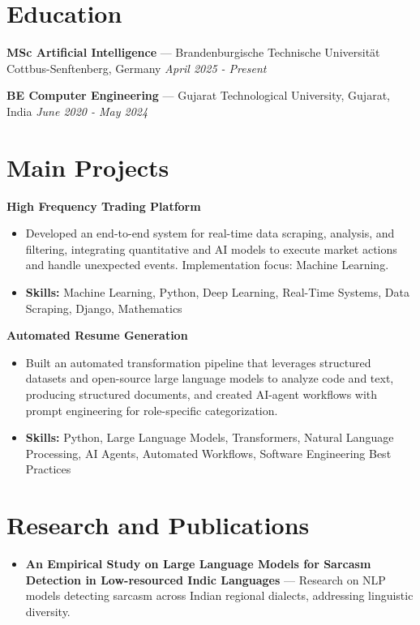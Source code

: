 \documentclass[a4paper,10pt]{article}
\begin{document}
\section*{Education}
\textbf{MSc Artificial Intelligence} — Brandenburgische Technische Universität Cottbus-Senftenberg, Germany \hfill \textit{April 2025 - Present}\par
\vspace{1.5pt}
\textbf{BE Computer Engineering} — Gujarat Technological University, Gujarat, India \hfill \textit{June 2020 - May 2024}\par

\section*{Main Projects}
\textbf{High Frequency Trading Platform}\par
\vspace{1pt}
\begin{itemize}
  \item Developed an end-to-end system for real-time data scraping, analysis, and filtering, integrating quantitative and AI models to execute market actions and handle unexpected events. Implementation focus: Machine Learning.
  \item \textbf{Skills:} Machine Learning, Python, Deep Learning, Real-Time Systems, Data Scraping, Django, Mathematics
\end{itemize}
\vspace{3pt}
\textbf{Automated Resume Generation}\par
\vspace{1pt}
\begin{itemize}
  \item Built an automated transformation pipeline that leverages structured datasets and open-source large language models to analyze code and text, producing structured documents, and created AI-agent workflows with prompt engineering for role-specific categorization.
  \item \textbf{Skills:} Python, Large Language Models, Transformers, Natural Language Processing, AI Agents, Automated Workflows, Software Engineering Best Practices
\end{itemize}

\section*{Research and Publications}
\begin{itemize}
\item \textbf{An Empirical Study on Large Language Models for Sarcasm Detection in Low-resourced Indic Languages} — Research on NLP models detecting sarcasm across Indian regional dialects, addressing linguistic diversity.
\end{itemize}
\end{document}
